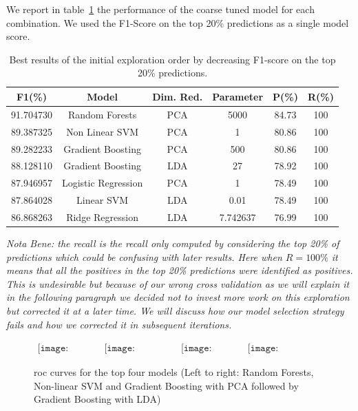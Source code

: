 We report in table~\ref{initial_results} the performance of the coarse tuned model for each combination. We used the F1-Score on the top 20\% predictions as a single model score.

\begin{table}[h]
\begin{center}
\begin{tabular}{c c c c c c}
\hline
\textbf{F1(\%)} & \textbf{Model} & \textbf{Dim. Red.} & \textbf{Parameter} & \textbf{P(\%)} & \textbf{R(\%)}\\ 
\hline\hline
91.704730 & Random Forests & PCA & 5000 & 84.73 & 100\\
89.387325 & Non Linear SVM & PCA & 1 & 80.86 & 100\\
89.282233 & Gradient Boosting & PCA & 500 & 80.86 & 100\\
88.128110 & Gradient Boosting & LDA & 27 & 78.92 & 100\\
87.946957 & Logistic Regression & PCA & 1 & 78.49 & 100\\
87.864028 & Linear SVM & LDA & 0.01 & 78.49 & 100\\
86.868263 & Ridge Regression & LDA & 7.742637 & 76.99 & 100
\end{tabular}
\end{center}
\caption{\label{initial_results}Best results of the initial exploration order by decreasing F1-score on the top 20\% predictions.}
\end{table}

\textit{Nota Bene: the recall is the recall only computed by considering the top 20\% of predictions which could be confusing with later results. Here when $R=100\%$ it means that all the positives in the top 20\% predictions were identified as positives. This is undesirable but because of our wrong cross validation as we will explain it in the following paragraph we decided not to invest more work on this exploration but corrected it at a later time. We will discuss how our model selection strategy fails and how we corrected it in subsequent iterations.}

\begin{figure}[h]
\begin{center}$
\begin{array}{cccc}
\texttt{[image: ROC\_RF]} &
\texttt{[image: ROC\_NSVM]} &
\texttt{[image: ROC\_GB]} &
\texttt{[image: ROC\_GBLDA]} 
\end{array}$
\end{center}
\caption{\label{ROC_init} \acrshort{roc} curves for the top four models (Left to right: Random Forests, Non-linear SVM and Gradient Boosting with PCA followed by Gradient Boosting with LDA)}
\end{figure}

